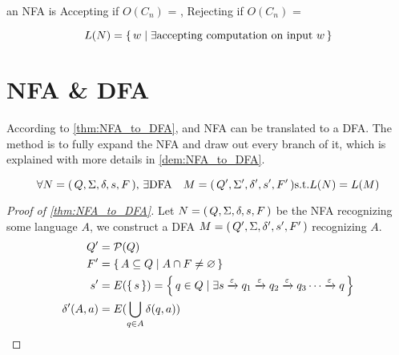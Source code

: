 an NFA is Accepting if $O(C_n)$ = \true , Rejecting if $O(C_n)$ = \false 

\begin{definition}
    \[
        L(N) = { \left\{\,w \mid \exists \text{accepting computation on input $w$} \,\right\} }
    \]
\end{definition}

\section{NFA \& DFA}

According to \autoref{thm:NFA_to_DFA}, and NFA can be translated to a DFA. The method is
to fully expand the NFA and draw out every branch of it, which is explained with more
details in \autoref{dem:NFA_to_DFA}.

\begin{theorem}
    \label{thm:NFA_to_DFA}
    \[
        \forall { N = { \left(\,Q, \Sigma, \delta, s, F\,\right) } },\,
        \exists \text{\upshape DFA} \quad M = { \left(\, Q', \Sigma', \delta', s', F'\,\right) } \text{s.t.}
        L(N) = L(M)
    \]
\end{theorem}

\begin{proof}[Proof of \autoref{thm:NFA_to_DFA}]
    \label{dem:NFA_to_DFA}
    Let ${ N = { \left(\,Q, \Sigma, \delta, s, F\,\right) } }$ be the NFA recognizing some language $A$,
    we construct a DFA $M = { \left(\,Q',\Sigma,\delta',s',F'\,\right) }$ recognizing $A$.
    \begin{align*}
        Q' &= \mathcal{P}(Q) \\
        F' &= { \left\{\, A \subseteq Q \mid A \cap F \neq \varnothing\,\right\} } \\
        s' &= E({ \left\{\,s\,\right\} })  = { \left\{\,q \in Q \mid \exists s
                                                \xrightarrow\varepsilon q_1
                                                \xrightarrow\varepsilon q_2
                                                \xrightarrow\varepsilon q_3
                                                \cdots 
                                                \xrightarrow\varepsilon q
        \,\right\} } \\
        \delta'(A, a) &= E( \operatorname*\bigcup_{q \in A} \delta (q,a) )
    \end{align*}
\end{proof}
